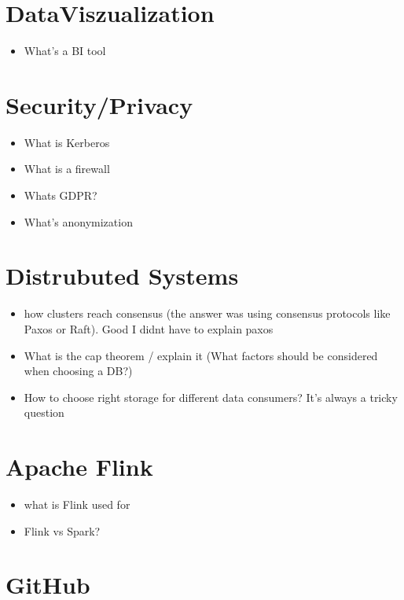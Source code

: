 \documentclass[12pt, numbers=noenddot]{scrreprt} %
\begin{document}
\section*{DataViszualization}

\begin{itemize}
\item What's a BI tool
\end{itemize}

\section*{Security/Privacy}

\begin{itemize}
\item What is Kerberos
\item What is a firewall
\item Whats GDPR?
\item What's anonymization
\end{itemize}

\section*{Distrubuted Systems}

\begin{itemize}
\item how clusters reach consensus (the answer was using consensus protocols like Paxos or Raft). Good I didnt have to explain paxos
\item What is the cap theorem / explain it (What factors should be considered when choosing a DB?)
\item How to choose right storage for different data consumers? It’s always a tricky question
\end{itemize}

\section*{Apache Flink}

\begin{itemize}
\item what is Flink used for
\item Flink vs Spark?
\end{itemize}

\section*{GitHub}
\end{document}
